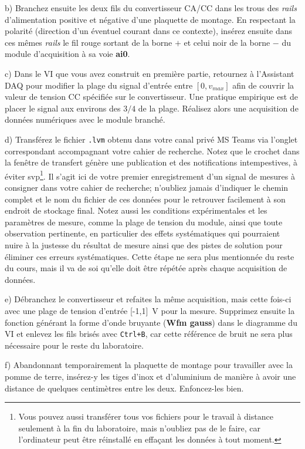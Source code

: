 \documentclass[canadien,12pt,oneside,letterpaper]{article}
\begin{document}
b) Branchez ensuite les deux fils du convertisseur CA/CC dans les trous des \textit{rails} d'alimentation positive et négative d'une plaquette de montage. En respectant la polarité (direction d'un éventuel courant dans ce contexte), insérez ensuite dans ces mêmes \textit{rails} le fil rouge sortant de la borne $+$ et celui noir de la borne $-$ du module d'acquisition à sa voie \textbf{ai0}.

c) Dans le VI que vous avez construit en première partie, retournez à l'Assistant DAQ pour modifier la plage du signal d'entrée entre $[0,v_{max}]$ afin de couvrir la valeur de tension CC spécifiée sur le convertisseur. Une pratique empirique est de placer le signal aux environs des $3/4$ de la plage. Réalisez alors une acquisition de données numériques avec le module branché. 

d) Transférez le fichier \texttt{.lvm} obtenu dans votre canal privé MS Teams via l'onglet correspondant accompagnant votre cahier de recherche. Notez que le crochet dans la fenêtre de transfert génère une publication et des notifications intempestives, à éviter svp\footnote{Vous pouvez aussi transférer tous vos fichiers pour le travail à distance seulement à la fin du laboratoire, mais n'oubliez pas de le faire, car l'ordinateur peut être réinstallé en effaçant les données à tout moment.}. Il s'agit ici de votre premier enregistrement d'un signal de mesures à consigner dans votre cahier de recherche; n'oubliez jamais d'indiquer le chemin complet et le nom du fichier de ces données pour le retrouver facilement à son endroit de stockage final. Notez aussi les conditions expérimentales et les paramètres de mesure, comme la plage de tension du module, ainsi que toute observation pertinente, en particulier des effets systématiques qui pourraient nuire à la justesse du résultat de mesure ainsi que des pistes de solution pour éliminer ces erreurs systématiques. Cette étape ne sera plus mentionnée du reste du cours, mais il va de soi qu'elle doit être répétée après chaque acquisition de données.

e) Débranchez le convertisseur et refaites la même acquisition, mais cette fois-ci avec une plage de tension d'entrée [-1,1]~V pour la mesure. Supprimez ensuite la fonction générant la forme d'onde bruyante (\textbf{Wfm gauss}) dans le diagramme du VI et enlevez les fils brisés avec \texttt{Ctrl+B}, car cette référence de bruit ne sera plus nécessaire pour le reste du laboratoire.
 
f) Abandonnant temporairement la plaquette de montage pour travailler avec la pomme de terre, insérez-y les tiges d'inox et d'aluminium de manière à avoir une distance de quelques centimètres entre les deux. Enfoncez-les bien. %
\end{document}
